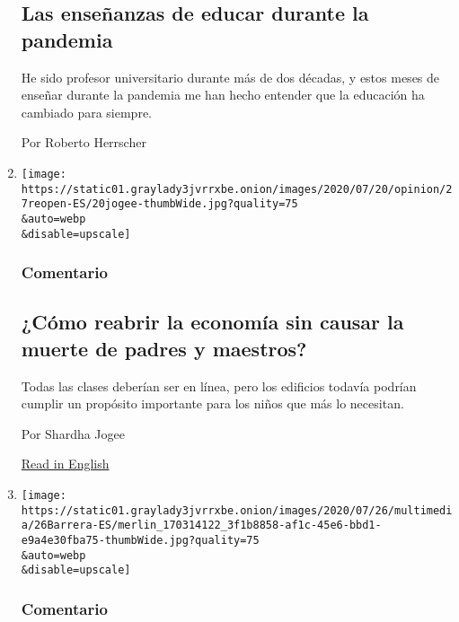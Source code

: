 \begin{enumerate}
  \hypertarget{las-enseuxf1anzas-de-educar-durante-la-pandemia}{%
  \subsection{Las enseñanzas de educar durante la
  pandemia}\label{las-enseuxf1anzas-de-educar-durante-la-pandemia}}

  He sido profesor universitario durante más de dos décadas, y estos
  meses de enseñar durante la pandemia me han hecho entender que la
  educación ha cambiado para siempre.

  Por Roberto Herrscher
\item
  \href{/es/2020/07/27/espanol/opinion/reabrir-escuelas-riesgo-covid.html}{}

  \texttt{[image: https://static01.graylady3jvrrxbe.onion/images/2020/07/20/opinion/27reopen-ES/20jogee-thumbWide.jpg?quality=75\\\&auto=webp\\\&disable=upscale]}

  \hypertarget{comentario-11}{%
  \subsubsection{Comentario}\label{comentario-11}}

  \hypertarget{cuxf3mo-reabrir-la-economuxeda-sin-causar-la-muerte-de-padres-y-maestros}{%
  \subsection{¿Cómo reabrir la economía sin causar la muerte de padres y
  maestros?}\label{cuxf3mo-reabrir-la-economuxeda-sin-causar-la-muerte-de-padres-y-maestros}}

  Todas las clases deberían ser en línea, pero los edificios todavía
  podrían cumplir un propósito importante para los niños que más lo
  necesitan.

  Por Shardha Jogee

  \href{https://www.nytimes3xbfgragh.onion/2020/07/20/opinion/coronavirus-reopen-schools-economy.html}{Read
  in English}
\item
  \href{/es/2020/07/26/espanol/opinion/nicmer-evans-venezuela.html}{}

  \texttt{[image: https://static01.graylady3jvrrxbe.onion/images/2020/07/26/multimedia/26Barrera-ES/merlin\_170314122\_3f1b8858-af1c-45e6-bbd1-e9a4e30fba75-thumbWide.jpg?quality=75\\\&auto=webp\\\&disable=upscale]}

  \hypertarget{comentario-12}{%
  \subsubsection{Comentario}\label{comentario-12}}


\end{enumerate}
